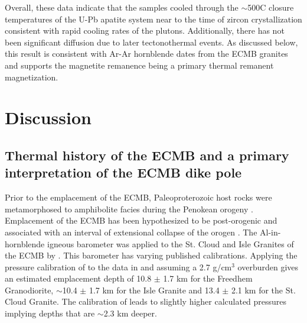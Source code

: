 \documentclass[draft]{agujournal2019}
\begin{document}
Overall, these data indicate that the samples cooled through the $\sim$500\textdegree C closure temperatures of the U-Pb apatite system near to the time of zircon crystallization consistent with rapid cooling rates of the plutons. Additionally, there has not been significant diffusion due to later tectonothermal events. As discussed below, this result is consistent with Ar-Ar hornblende dates from the ECMB granites and supports the magnetite remanence being a primary thermal remanent magnetization.

\section*{Discussion}

\subsection*{Thermal history of the ECMB and a primary interpretation of the ECMB dike pole}

Prior to the emplacement of the ECMB, Paleoproterozoic host rocks were metamorphosed to amphibolite facies during the Penokean orogeny \cite{Holm1990a}. Emplacement of the ECMB has been hypothesized to be post-orogenic and associated with an interval of extensional collapse of the orogen \cite{Holm1998a, Boerboom2000a}. The Al-in-hornblende igneous barometer was applied to the St. Cloud and Isle Granites of the ECMB by \cite{Holm1998a}. This barometer has varying published calibrations. Applying the pressure calibration of  to the data in  and assuming a 2.7 g/cm$^{3}$ overburden gives an estimated emplacement depth of 10.8 $\pm$ 1.7 km for the Freedhem Granodiorite, $\sim$10.4 $\pm$ 1.7 km for the Isle Granite and 13.4 $\pm$ 2.1 km for the St. Cloud Granite. The calibration of  leads to slightly higher calculated pressures implying depths that are $\sim$2.3 km deeper. 
\end{document}
